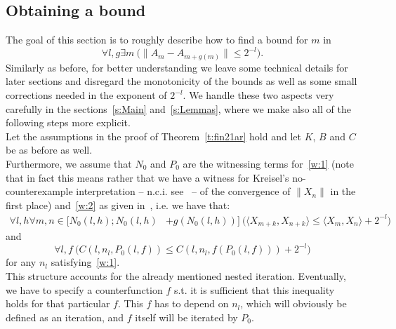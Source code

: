 \subsection{Obtaining a bound}\label{s:terms}
The goal of this section is to roughly describe how to find a bound for $m$ in
\[
\forall l,g \exists m\ \big( \|A_m-A_{m+g(m)}\|\leq 2^{-l} \big).
\]
Similarly as before, for better understanding we leave some technical details
for later sections and disregard the monotonicity of the bounds as well as some
small corrections needed in the exponent of $2^{-l}$.
We handle these two aspects very carefully in the sections~\ref{s:Main} and~\ref{s:Lemmas}, where we make also
all of the following steps more explicit.\\
Let the assumptions in the proof of Theorem~\ref{t:fin21ar} hold and let $K$, 
$B$ and $C$ be as before as well.\\
Furthermore, we assume that $N_0$ and $P_0$ are the witnessing terms for~\eqref{w:1} (note that in
fact this means rather that we have a witness for Kreisel's no-counterexample interpretation -- n.c.i. see~\cite{Kreisel51, Kreisel1959} -- of the
convergence of $\|X_n\|$ in the first place) and~\eqref{w:2} as given in~\cite{Kohlenbach08}, i.e. we have that:
\begin{align*}
\forall l,h \forall m,n\in[N_0(l,h) ; N_0(l,h)&+g(N_0(l,h))]\ \big( 
\langle X_{m+k},X_{n+k}\rangle \leq \langle X_{m},X_{n}\rangle + 2^{-l} \big)
\end{align*}
and
\[
\forall l,f \ \big( C(l,n_l,P_0(l,f))\leq C(l,n_l,f(P_0(l,f))) + 2^{-l} \big)
\]
for any $n_l$ satisfying~\eqref{w:1}.\\ This structure accounts for the already mentioned nested iteration.  
Eventually, we have to specify a counterfunction $f$ s.t. it is sufficient that this inequality holds for that particular $f$. 
This $f$ has to depend on $n_l$, which will obviously be defined as an iteration, and $f$ itself will be iterated by $P_0$.\\
